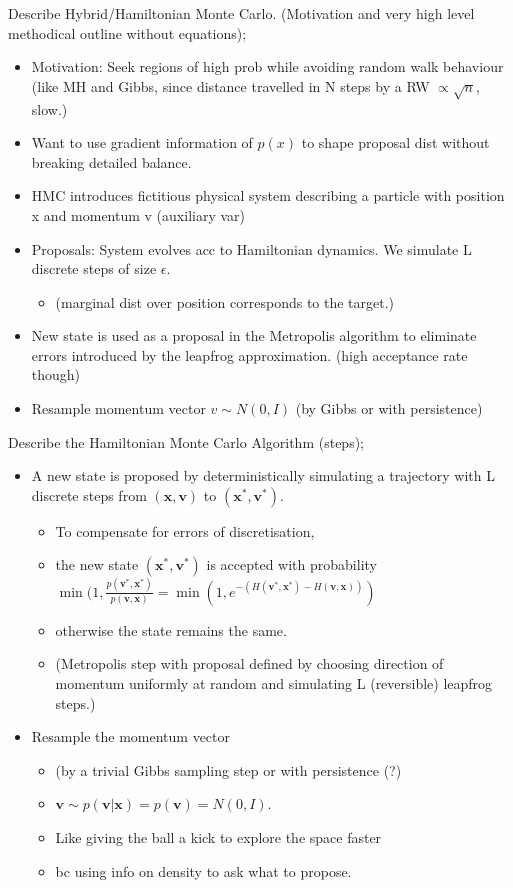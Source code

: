 \documentclass{article}
\begin{document}
Describe Hybrid/Hamiltonian Monte Carlo. (Motivation and very high level methodical outline without equations); \begin{itemize}
    \item Motivation: Seek regions of high prob while avoiding random walk behaviour (like MH and Gibbs, since distance travelled in N steps by a RW $\propto \sqrt{n}$, slow.)
    \item Want to use gradient information of $p(x)$ to shape proposal dist without breaking detailed balance.
    \item HMC introduces fictitious physical system describing a particle with position x and momentum v (auxiliary var)
    \item Proposals: System evolves acc to Hamiltonian dynamics. We simulate L discrete steps of size $\epsilon$. \begin{itemize}
        \item (marginal dist over position corresponds to the target.)
    \end{itemize} 
    \item New state is used as a proposal in the Metropolis algorithm to eliminate errors introduced by the leapfrog approximation. (high acceptance rate though)
    \item Resample momentum vector $v\sim N(0,I)$ (by Gibbs or with persistence)
\end{itemize}


Describe the Hamiltonian Monte Carlo Algorithm (steps); \begin{itemize}
    \item A new state is proposed by deterministically simulating a trajectory with L discrete steps from $(\mathbf{x, v})$ to $(\mathbf{x^*, v^*})$. \begin{itemize}
        \item To compensate for errors of discretisation, 
        \item the new state $(\mathbf{x^*, v^*})$ is accepted with probability $\min (1, \frac{p(\mathbf{v^*, x^*})}{p(\mathbf{v, x})}=\min(1, e^{-(H(\mathbf{v^*, x^*})-H(\mathbf{v, x}))})$
        \item otherwise the state remains the same. 
        \item (Metropolis step with proposal defined by choosing direction of momentum uniformly at random and simulating L (reversible) leapfrog steps.) 
    \end{itemize}
    \item Resample the momentum vector \begin{itemize}
        \item (by a trivial Gibbs sampling step or with persistence (?)
        \item $\mathbf{v}\sim p(\mathbf{v|x}) = p(\mathbf{v}) = N(0,I)$.
        \item Like giving the ball a kick to explore the space faster
        \item bc using info on density to ask what to propose.
    \end{itemize}
\end{itemize}
\end{document}
